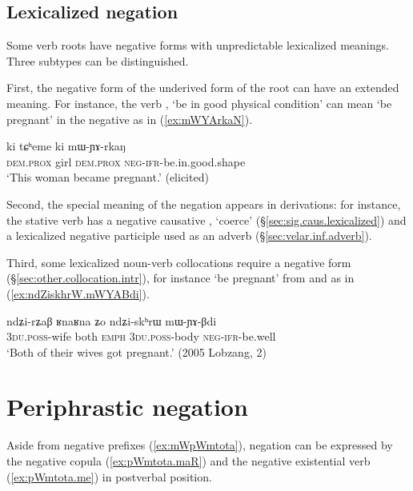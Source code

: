 \subsection{Lexicalized negation} \label{sec:lexicalized.negative}
Some verb roots have negative forms with unpredictable lexicalized meanings. Three subtypes can be distinguished.

First, the negative form of the underived form of the root can have an extended meaning. For instance, the verb , `be in good physical condition' can mean `be pregnant' in the negative as in (\ref{ex:mWYArkaN}).

\begin{exe}
	\ex \label{ex:mWYArkaN}
	\gll ki tɕʰeme ki mɯ-ɲɤ-rkaŋ \\
	\textsc{dem}.\textsc{prox} girl \textsc{dem}.\textsc{prox} \textsc{neg}-\textsc{ifr}-be.in.good.shape \\
	\glt `This woman became pregnant.' (elicited)
\end{exe}

Second, the special meaning of the negation appears in derivations: for instance, the stative verb  has a negative causative , `coerce'  (§\ref{sec:sig.caus.lexicalized}) and a lexicalized negative participle  used as an adverb (§\ref{sec:velar.inf.adverb}). 


Third, some lexicalized noun-verb collocations require a negative form (§\ref{sec:other.collocation.intr}), for instance  `be pregnant' from  and  as in (\ref{ex:ndZiskhrW.mWYABdi}).

\begin{exe}
	\ex \label{ex:ndZiskhrW.mWYABdi}
	\gll ndʑi-rʑaβ ʁnaʁna ʑo ndʑi-skʰrɯ mɯ-ɲɤ-βdi  \\
	\textsc{3du}.\textsc{poss}-wife both \textsc{emph} \textsc{3du}.\textsc{poss}-body \textsc{neg}-\textsc{ifr}-be.well \\
	\glt `Both of their wives got pregnant.' (2005 Lobzang, 2) 
\end{exe}  

\section{Periphrastic negation} \label{sec:periphrastic.negation}
Aside from negative prefixes (\ref{ex:mWpWmtota}), negation can be expressed by the negative copula  (\ref{ex:pWmtota.maR}) and the negative existential verb  (\ref{ex:pWmtota.me}) in postverbal position. 

